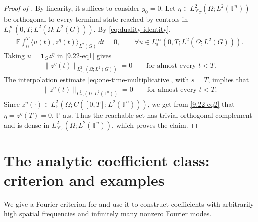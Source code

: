 \documentclass[print,wide]{draft}
\begin{document}
\begin{proof}[Proof of ]
By linearity, it suffices to consider $y_0=0$.
Let $\eta\in L^2_{\mathcal F_T}(\Omega;L^2(\mathbb T^n))$ be orthogonal
to every terminal state reached by controls in
$L^\infty_{\mathbb F}(0,T;L^2(\Omega;L^2(G)))$.
By \eqref{eq:duality-identity},
%
\begin{align}\label{9.22-eq1}
\mathbb E\int_0^T\langle u(t),z^\eta(t)\rangle_{L^2(G)}\,dt=0, \qquad \forall u\in L^\infty_{\mathbb F}(0,T;L^2(\Omega;L^2(G))).
\end{align}
%
Taking $u=\mathbf{1}_G z^\eta$ in \eqref{9.22-eq1} gives
\begin{align*}
\|z^\eta(t)\|_{L^2_{\mathcal F_t}(\Omega;L^2(G))}=0
\qquad\text{for almost every }t<T.
\end{align*}
The interpolation estimate \eqref{eq:one-time-multiplicative}, with $s=T$,
implies that 
\begin{align}\label{9.22-eq2}
	\|z^\eta(t)\|_{L^2_{\mathcal F_t}(\Omega;L^2(\mathbb T^n))}=0
	\qquad\text{for almost every }t<T.
\end{align} 
Since $z^\eta(\cdot)\in L^2_{\mathbb F}(\Omega;C([0,T];L^2(\mathbb{T}^n)))$, we get from \eqref{9.22-eq2} that $\eta=z^\eta(T)=0$, $\mathbb P$-a.s.
Thus the reachable set has trivial orthogonal complement and is dense in
$L^2_{\mathcal F_T}(\Omega;L^2(\mathbb T^n))$, which proves the claim.
\end{proof}

\section{The analytic coefficient class: criterion and examples}\label{sec:richness}

We give a Fourier criterion for  and use
it to construct coefficients with arbitrarily high spatial frequencies
and infinitely many nonzero Fourier modes.
\end{document}

